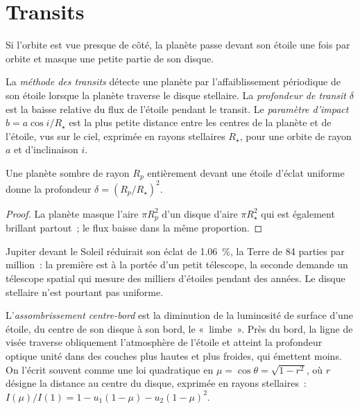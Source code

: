 \section{Transits}\label{sec:b3:exoplanets:transits}

Si l'orbite est vue presque de côté, la planète passe devant son étoile
une fois par orbite et masque une petite partie de son disque.

\begin{definition}\label{def:b3:exoplanets:transit}
La \emph{méthode des transits} détecte une planète par
l'affaiblissement périodique de son étoile lorsque la planète traverse le disque stellaire. La
\emph{profondeur de transit} $\delta$ est la baisse relative
du flux de l'étoile pendant le transit. Le \emph{paramètre d'impact}
$b = a\cos i/R_\star$ est la plus petite distance entre les centres de la planète et
de l'étoile, vus sur le ciel, exprimée en rayons stellaires $R_\star$, pour
une orbite de rayon $a$ et
d'inclinaison $i$.
\end{definition}

\begin{proposition}\label{prop:b3:exoplanets:depth}
Une planète sombre de rayon $R_p$ entièrement devant une étoile
d'éclat uniforme donne la profondeur $\delta = (R_p/R_\star)^2$.
\end{proposition}

\begin{proof}
La planète masque l'aire $\pi R_p^2$ d'un disque d'aire $\pi R_\star^2$
qui est également brillant partout~; le flux baisse dans la même proportion.
\end{proof}

Jupiter devant le Soleil réduirait son éclat de \qty{1.06}{\percent}, la Terre
de \num{84} parties par million~: la première est à la portée d'un petit
télescope, la seconde demande un télescope spatial qui mesure des milliers d'étoiles
pendant des années. Le disque stellaire n'est pourtant pas uniforme.

\begin{definition}\label{def:b3:exoplanets:limb}
L'\emph{assombrissement centre-bord} est la diminution de la luminosité de surface
d'une étoile, du centre de son disque à son bord, le «~limbe~».
Près du bord, la ligne de visée traverse obliquement l'atmosphère de l'étoile
et atteint la profondeur optique unité dans des couches plus hautes et plus froides, qui
émettent moins. On l'écrit souvent comme une loi quadratique en $\mu = \cos\theta =
\sqrt{1 - r^2}$, où $r$ désigne la distance au centre du disque, exprimée
en rayons stellaires~: $I(\mu)/I(1) = 1 - u_1(1 - \mu) - u_2(1 - \mu)^2$.
\end{definition}

